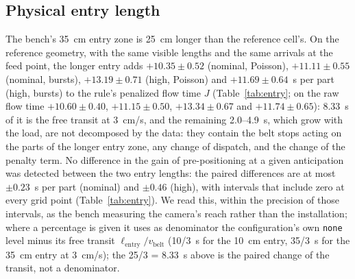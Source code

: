 \documentclass[11pt,a4paper]{article}
\newcommand{\nj}{\textsc{nj}}
\newcommand{\vb}{v_{\mathrm{belt}}}
\begin{document}
\subsection{Physical entry length}\label{sec:entry}
The bench's 35~cm entry zone is 25~cm longer than the reference cell's. On the reference
geometry, with the same visible lengths and the same arrivals at the feed point, the
longer entry adds $+10.35\pm0.52$ (nominal, Poisson), $+11.11\pm0.55$ (nominal, bursts),
$+13.19\pm0.71$ (high, Poisson) and $+11.69\pm0.64$~s per part (high, bursts) to the
rule's penalized flow time $J$ (Table~\ref{tab:entry}; on the raw flow time $+10.60\pm0.40$,
$+11.15\pm0.50$, $+13.34\pm0.67$ and $+11.74\pm0.65$): 8.33~s of it is the free transit at
3~cm/s, and the remaining 2.0--4.9~s, which grow with the load, are not decomposed by
the data: they contain the belt stops acting on the parts of the longer entry zone, any
change of dispatch, and the change of the penalty term. No difference in the gain of pre-positioning at a given anticipation was detected
between the two entry lengths: the paired differences are at most $\pm0.23$~s per part
(nominal) and $\pm0.46$ (high), with intervals that include zero at every grid point
(Table~\ref{tab:entry}). We read this, within the precision of those intervals, as the
bench measuring the camera's reach rather than the installation; where a percentage is given it uses as denominator the configuration's own \texttt{none} level minus its free transit $\ell_{\mathrm{entry}}/\vb$ (10/3~s for the 10~cm entry, 35/3~s for the 35~cm entry at 3~cm/s); the 25/3 = 8.33~s above is the paired change of the transit, not a denominator.

\begin{table}[t]
\centering\small
\caption{Physical-length check, \nj, reference geometry ($d=12$~cm, $v_x=v_y=10$~cm/s):
the 35~cm entry against the 10~cm entry, same visible lengths, same arrivals at the feed
point. $\Delta$ `none' level: penalized flow time $J$ added by the longer entry; $\Delta G$: difference
of the pre-positioning gain at the same anticipation (35~cm minus 10~cm), paired, 95\,\%
CI.}
\label{tab:entry}
\resizebox{\linewidth}{!}{}
\end{table}
\end{document}
